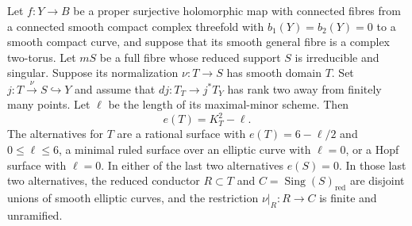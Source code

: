 \begin{proposition}\hypertarget{tag-02WM}{}\label{night:P4.15}\label{stmt:P4.15}

Let $f:Y\to B$ be a proper surjective holomorphic map with
connected fibres from a connected smooth compact complex threefold
with $b_1(Y)=b_2(Y)=0$ to a smooth compact curve, and suppose that
its smooth general fibre is a complex two-torus. Let $mS$ be a full
fibre whose reduced support $S$ is irreducible and singular.
Suppose its normalization $\nu:T\to S$ has smooth domain $T$. Set
$j:T\xrightarrow{\nu}S\hookrightarrow Y$ and assume that
$dj:T_T\to j^*T_Y$ has rank two away from finitely many points.
Let $\ell$ be the length of its maximal-minor scheme. Then
\[
 e(T)=K_T^2-\ell.
\]
The alternatives for $T$ are a rational surface with
$e(T)=6-\ell/2$ and $0\leq\ell\leq6$, a minimal ruled surface
over an elliptic curve with $\ell=0$, or a Hopf surface with
$\ell=0$. In either of the last two alternatives $e(S)=0$.
In those last two alternatives, the reduced conductor $R\subset T$
and $C=\operatorname{Sing}(S)_{\mathrm{red}}$ are disjoint unions of
smooth elliptic curves, and the restriction $\nu|_R:R\to C$ is
finite and unramified.
\end{proposition}

